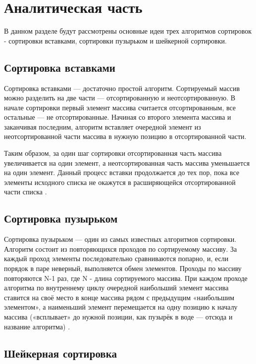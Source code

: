 \chapter{Аналитическая часть}

В данном разделе будут рассмотрены основные идеи трех алгоритмов сортировок - сортировки вставками, сортировки пузырьком и шейкерной сортировки.

\section{Сортировка вставками}

 Сортировка вставками — достаточно простой алгоритм. Сортируемый массив можно разделить на две части — отсортированную и неотсортированную. В начале сортировки первый элемент массива считается отсортированным, все остальные — не отсортированные. Начиная со второго элемента массива и заканчивая последним, алгоритм вставляет очередной элемент из неотсортированной части массива в нужную позицию в отсортированной части. 
 
 Таким образом, за один шаг сортировки отсортированная часть массива увеличивается на один элемент, а неотсортированная часть массива уменьшается на один элемент. Данный процесс вставки продолжается до тех пор, пока все элементы исходного списка не окажутся в расширяющейся отсортированной части списка \cite{article_insert}.


\section{Сортировка пузырьком}

Сортировка пузырьком — один из самых известных алгоритмов сортировки. Алгоритм  состоит  из  повторяющихся  проходов  по  сортируемому массиву. За каждый проход элементы последовательно сравниваются попарно, и, если порядок в паре неверный, выполняется обмен элементов. Проходы  по  массиву повторяются  N-1 раз, где N - длина сортируемого массива.  При каждом  проходе  алгоритма  по  внутреннему  циклу  очередной  наибольший  элемент  массива ставится на своё место в конце массива рядом с предыдущим «наибольшим элементом», а наименьший элемент перемещается на одну позицию к  началу  массива  («всплывает»  до  нужной  позиции,  как  пузырёк  в воде — отсюда  и  название алгоритма) \cite{first_book}.

\section{Шейкерная сортировка}

